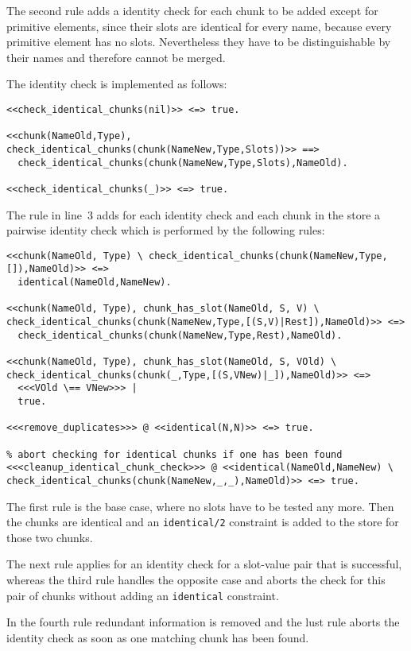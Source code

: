The second rule adds a identity check for each chunk to be added except for primitive elements, since their slots are identical for every name, because every primitive element has no slots. Nevertheless they have to be distinguishable by their names and therefore cannot be merged.

The identity check is implemented as follows:

\begin{lstlisting}
<<check_identical_chunks(nil)>> <=> true.

<<chunk(NameOld,Type), check_identical_chunks(chunk(NameNew,Type,Slots))>> ==> 
  check_identical_chunks(chunk(NameNew,Type,Slots),NameOld).
  
<<check_identical_chunks(_)>> <=> true.
\end{lstlisting}

The rule in line~3 adds for each identity check and each chunk in the store a pairwise identity check which is performed by the following rules:

\begin{lstlisting}
<<chunk(NameOld, Type) \ check_identical_chunks(chunk(NameNew,Type,[]),NameOld)>> <=> 
  identical(NameOld,NameNew).
  
<<chunk(NameOld, Type), chunk_has_slot(NameOld, S, V) \ check_identical_chunks(chunk(NameNew,Type,[(S,V)|Rest]),NameOld)>> <=> 
  check_identical_chunks(chunk(NameNew,Type,Rest),NameOld).
  
<<chunk(NameOld, Type), chunk_has_slot(NameOld, S, VOld) \ check_identical_chunks(chunk(_,Type,[(S,VNew)|_]),NameOld)>> <=> 
  <<<VOld \== VNew>>> |
  true.
    
<<<remove_duplicates>>> @ <<identical(N,N)>> <=> true.

% abort checking for identical chunks if one has been found
<<<cleanup_identical_chunk_check>>> @ <<identical(NameOld,NameNew) \ check_identical_chunks(chunk(NameNew,_,_),NameOld)>> <=> true.
\end{lstlisting}

The first rule is the base case, where no slots have to be tested any more. Then the chunks are identical and an \verb|identical/2| constraint is added to the store for those two chunks.

The next rule applies for an identity check for a slot-value pair that is successful, whereas the third rule handles the opposite case and aborts the check for this pair of chunks without adding an \verb|identical| constraint.

In the fourth rule redundant information is removed and the lust rule aborts the identity check as soon as one matching chunk has been found.

